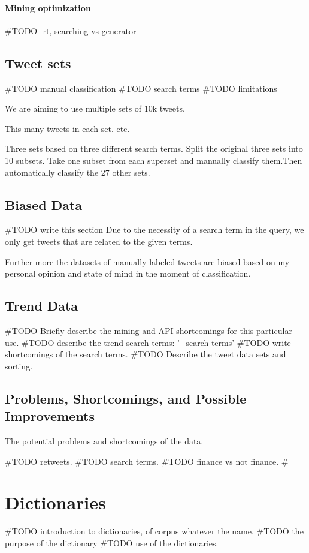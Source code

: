 \paragraph{Mining optimization}
#TODO -rt, searching vs generator 
%

\subsection{Tweet sets}
#TODO manual classification
#TODO search terms
#TODO limitations

We are aiming to use multiple sets of 10k tweets. 

This many tweets in each set. etc. 

Three sets based on three different search terms.
Split the original three sets into 10 subsets. 
Take one subset from each superset and manually classify them.Then
automatically classify the 27 other sets.  

\subsection{Biased Data}
#TODO write this section
Due to the necessity of a search term in the query, we only get tweets that are
related to the given terms.

Further more the datasets of manually labeled tweets are biased based on my
personal opinion and state of mind in the moment of classification.  

\subsection{Trend Data}
#TODO Briefly describe the mining and API shortcomings for this particular use.
#TODO describe the trend search terms: '_search-terms'
#TODO write shortcomings of the search terms. 
#TODO Describe the tweet data sets and sorting.  

\subsection{Problems, Shortcomings, and Possible Improvements}
The potential problems and shortcomings of the data. 

#TODO retweets. 
#TODO search terms.
#TODO finance vs not finance.
#  

\section{Dictionaries}\label{data:dictionaries}
#TODO introduction to dictionaries, of corpus whatever the name. 
#TODO the purpose of the dictionary
#TODO use of the dictionaries. 
%

